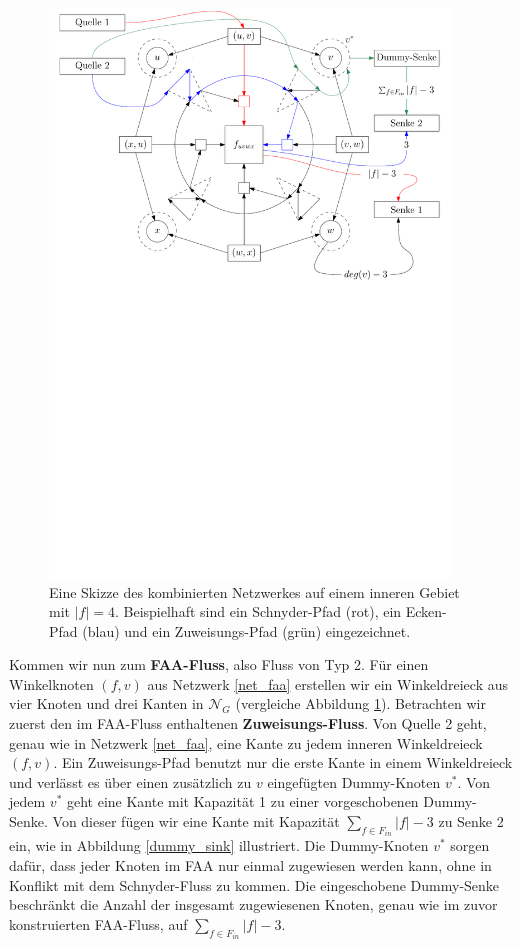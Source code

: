 \begin{figure}[h]
	\centering
  	\includegraphics[width=0.95\textwidth]{combined_face_sketch.pdf}
  	\caption{Eine Skizze des kombinierten Netzwerkes auf einem inneren Gebiet mit $|f| = 4$. Beispielhaft sind ein Schnyder-Pfad (rot), ein Ecken-Pfad (blau) und ein Zuweisungs-Pfad (grün) eingezeichnet. }
	\label{combined_face_sketch}
\end{figure}

Kommen wir nun zum \textbf{FAA-Fluss}, also Fluss von Typ 2. Für einen Winkelknoten $(f,v)$ aus Netzwerk \ref{net_faa} erstellen wir ein Winkeldreieck aus vier Knoten und drei Kanten in $\mathcal{N}_G$ (vergleiche Abbildung \ref{combined_face_sketch}). Betrachten wir zuerst den im FAA-Fluss enthaltenen \textbf{Zuweisungs-Fluss}. Von Quelle 2 geht, genau wie in Netzwerk \ref{net_faa}, eine Kante zu jedem inneren Winkeldreieck $(f,v)$. Ein Zuweisungs-Pfad benutzt nur die erste Kante in einem Winkeldreieck und verlässt es über einen zusätzlich zu $v$ eingefügten Dummy-Knoten $v^*$. Von jedem $v^*$ geht eine Kante mit Kapazität 1 zu einer vorgeschobenen Dummy-Senke. Von dieser fügen wir eine Kante mit Kapazität $\sum_{f \in F_{in}} |f|-3$ zu Senke 2 ein, wie in Abbildung \ref{dummy_sink} illustriert. Die Dummy-Knoten $v^*$ sorgen dafür, dass jeder Knoten im FAA nur einmal zugewiesen werden kann, ohne in Konflikt mit dem Schnyder-Fluss zu kommen. Die eingeschobene Dummy-Senke beschränkt die Anzahl der insgesamt zugewiesenen Knoten, genau wie im zuvor konstruierten FAA-Fluss, auf $\sum_{f \in F_{in}} |f|-3$.


